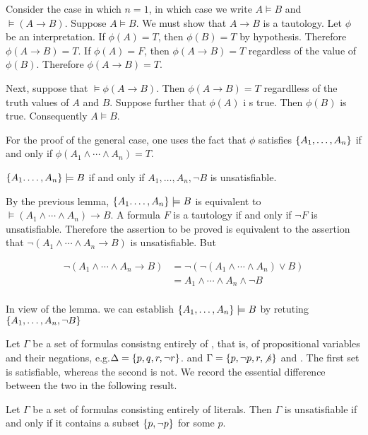 Consider the case in which $n= 1$, in which case we write $A \models B$ and
$\models (A \to B)$.  Suppose $A \models B$. We must show that $A \to B$
 is a tautology.  Let $\phi$ be an interpretation.  If $\phi(A) = T$, then
$\phi(B) = T$ by hypothesis.  Therefore $\phi(A \to B) = T$.  If $\phi(A) = F$, then $\phi(A \to B) = T$ regardless of the value of $\phi(B)$.  Therefore $\phi(A \to B) = T$.

Next, suppose that $\models \phi(A \to B)$.  Then $\phi(A \to B) = T$ regardlless of the truth values of $A$ and $B$.  Suppose further that $\phi(A)$ i s true. Then $\phi(B)$ is true.  Consequently $A \models B$.

For the proof of the general case, one uses the fact that $\phi$ satisfies $\{ A_1, \ldots, A_n \}$ if and only if $\phi(A_1 \land \cdots \land A_n) = T$. 

\begin{lemma}
$\{ A_1. \ldots , A_n \} \models B$ if and only if $A_1, \ldots , A_n, \neg B$ is unsatisfiable.
\end{lemma}

 By the previous lemma, $\{ A_1. \ldots , A_n \} \models B$  is equivalent to $\models (A_1 \land \cdots \land A_n) \to B$. A formula $F$ is a tautology if and only if $\neg F$ is unsatisfiable.  Therefore the assertion to be proved is equivalent to the assertion that $\neg (A_1 \land \cdots \land A_n \to B)$ is unsatisfiable.  But

\begin{align}
  \neg (A_1 \land \cdots \land A_n \to B) &=  \neg(\neg(A_1 \land \cdots \land A_n) \lor B) \\
  &= A_1 \land \cdots \land A_n \land \neg B \\
\end{align}


In view of the lemma. we can establish $\{ A_1, \ldots, A_n \} \models B$ by retuting $\{ A_1,  \ldots , A_n, \neg B \}$

Let $\Gamma$ be a set of formulas consistng entirely of , that is, of propositional variables and their negations, e.g.$\Delta = \{ p, q, r, \neg r \}$. and  $\Gamma = \{ p, \neg p, r, \not s \}$ and  . The first set is satisfiable, whereas the second is not.  We record the essential difference between the two in the following result.

\begin{lemma}
Let $\Gamma$ be a set of formulas consisting entirely of literals.  Then $\Gamma$ is unsatisfiable if and only if it contains a subset $\{ p, \neg p \}$ for some $p$.
\end{lemma}

